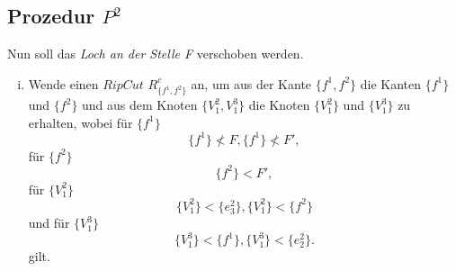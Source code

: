 \documentclass[12pt,titlepage]{article}
\begin{document}
\subsection{Prozedur $P^2$}
 Nun soll das \emph{Loch an der Stelle F} verschoben werden. 
\begin{enumerate}[(i)]
\item Wende einen $Rip Cut$ $R^{c}_{\{f^1,f^2\}}$ an, um aus der Kante $\{f^1,f^2\}$ die Kanten $\{f^1\}$ und $\{f^2\}$ und aus dem Knoten $\{V_1^2,V_1^3\}$ die Knoten $\{V_1^2\}$ und $\{V_1^3\}$ zu erhalten, wobei für $\{f^1\}$
\[
\{f^1\} \nless F,\{f^1\} \nless F',
\]
für $\{f^2\}$
\[
\{f^2\}< F',
\]
für $\{V_1^2\}$
\[
\{V_1^2\}<\{e_3^2\},\{V_1^2\}<\{f^2\}
\]
und für $\{V_1^3\}$
\[
\{V_1^3\}<\{f^1\},\{V_1^3\}<\{e_2^2\}.
\]
gilt.
\begin{figure}[h]
\begin{tikzpicture}[line cap=round,line join=round,>=triangle 45,x=1.0cm,y=1.0cm]


\end{tikzpicture}
\end{figure}
\end{enumerate}
\end{document}
